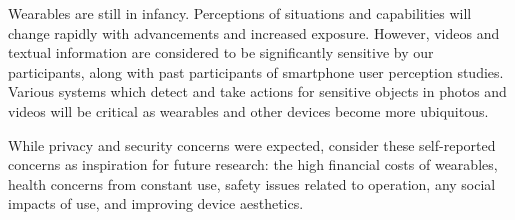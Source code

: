 Wearables are still in infancy. Perceptions of situations and capabilities will change rapidly with advancements and increased exposure. However, videos and textual information are considered to be significantly sensitive by our participants, along with past participants of smartphone user perception studies. Various systems which detect and take actions for sensitive objects in photos and videos will be critical as wearables and other devices become more ubiquitous.

While privacy and security concerns were expected, consider these self-reported concerns as inspiration for future research: the high financial costs of wearables, health concerns from constant use, safety issues related to operation, any social impacts of use, and improving device aesthetics.  